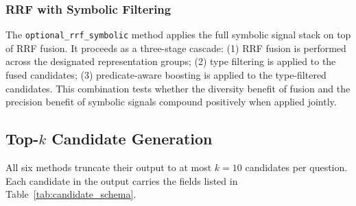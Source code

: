 \subsubsection{RRF with Symbolic Filtering}
\label{subsubsec:rrf_symbolic}

The \texttt{optional\_rrf\_symbolic} method applies the full symbolic
signal stack on top of RRF fusion.
It proceeds as a three-stage cascade: (1) RRF fusion is performed across
the designated representation groups; (2) type filtering is applied to
the fused candidates; (3) predicate-aware boosting is applied to the
type-filtered candidates.
This combination tests whether the diversity benefit of fusion and the
precision benefit of symbolic signals compound positively when applied
jointly.

\subsection{Top-$k$ Candidate Generation}
\label{subsec:topk}

All six methods truncate their output to at most $k = 10$ candidates per
question.
Each candidate in the output carries the fields listed in
Table~\ref{tab:candidate_schema}.

